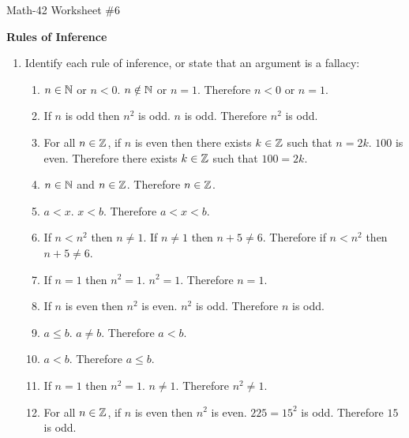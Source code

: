 \documentclass[letterpaper,12pt,fleqn]{article}
\begin{document}
\begin{center}
  \large Math-42 Worksheet \#6

  \textbf{Rules of Inference}
\end{center}

\vspace{0.5in}

\begin{enumerate}[left=0in,itemsep=0.5in]
\item Identify each rule of inference, or state that an argument is a fallacy:
  \begin{enumerate}
  \item \(n\in\mathbb{N}\) or \(n<0\).  \(n\notin\mathbb{N}\) or \(n=1\).  Therefore \(n<0\) or \(n=1\).
  \item If \(n\) is odd then \(n^2\) is odd.  \(n\) is odd.  Therefore \(n^2\) is odd.
  \item  For all \(n\in\mathbb{Z}\), if \(n\) is even then there exists \(k\in\mathbb{Z}\) such that \(n=2k\).  \(100\) is even.
    Therefore there exists \(k\in\mathbb{Z}\) such that \(100=2k\).
  \item \(n\in\mathbb{N}\) and \(n\in\mathbb{Z}\).  Therefore \(n\in\mathbb{Z}\).
  \item \(a<x\). \(x<b\).  Therefore \(a<x<b\).
  \item If \(n<n^2\) then \(n\ne1\).  If \(n\ne1\) then \(n+5\ne6\).  Therefore if \(n<n^2\) then \(n+5\ne 6\).
  \item If \(n=1\) then \(n^2=1\).  \(n^2=1\).  Therefore \(n=1\).
  \item If \(n\) is even then \(n^2\) is even.  \(n^2\) is odd.  Therefore \(n\) is odd.
  \item \(a\le b\).  \(a\ne b\).  Therefore \(a<b\).
  \item \(a<b\).  Therefore \(a\le b\).
  \item If \(n=1\) then \(n^2=1\).  \(n\ne1\).  Therefore \(n^2\ne1\).
  \item For all \(n\in\mathbb{Z}\), if \(n\) is even then \(n^2\) is even.  \(225=15^2\) is odd.  Therefore \(15\) is
    odd.
  \end{enumerate}


\end{enumerate}
\end{document}
